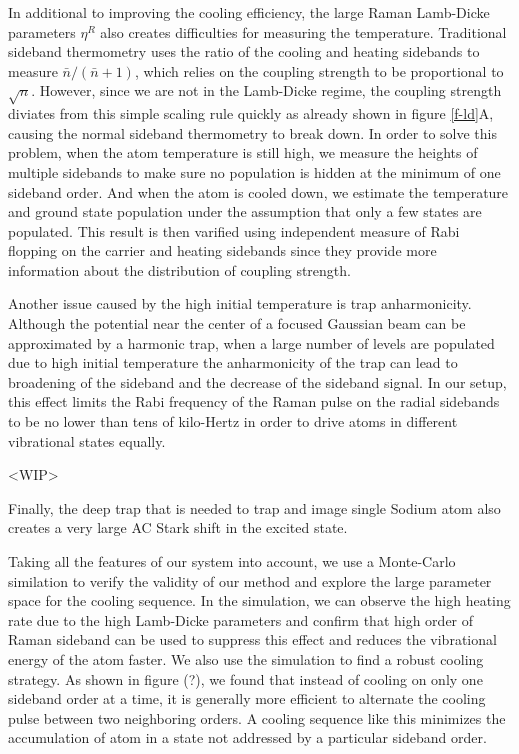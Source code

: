 \documentclass[aps,prl,twocolumn,groupedaddress]{revtex4-1}
\begin{document}
In additional to improving the cooling efficiency, the large Raman Lamb-Dicke parameters $\eta^R$
also creates difficulties for measuring the temperature. Traditional sideband thermometry uses
the ratio of the cooling and heating sidebands to measure $\bar n / (\bar n + 1)$, which relies
on the coupling strength to be proportional to $\sqrt{n}$. However, since we are not in the
Lamb-Dicke regime, the coupling strength diviates from this simple scaling rule quickly as already
shown in figure \ref{f-ld}A, causing the normal sideband thermometry to break down.
In order to solve this problem, when the atom temperature is still high,
we measure the heights of multiple sidebands to make sure no population is hidden at the
minimum of one sideband order. And when the atom is cooled down, we estimate the temperature
and ground state population under the assumption that only a few states are populated.
This result is then varified using independent measure of Rabi flopping on the carrier and heating
sidebands since they provide more information about the distribution of coupling strength.

Another issue caused by the high initial temperature is trap anharmonicity.
Although the potential near the center of a focused Gaussian beam can be approximated
by a harmonic trap, when a large number of levels are populated due to high initial temperature
the anharmonicity of the trap can lead to broadening of the sideband and the decrease of
the sideband signal. In our setup, this effect limits the Rabi frequency of the Raman pulse
on the radial sidebands to be no lower than tens of kilo-Hertz in order to drive atoms in
different vibrational states equally.

<WIP>

Finally, the deep trap that is needed to trap and image single Sodium atom also creates
a very large AC Stark shift in the excited state.


Taking all the features of our system into account, we use a Monte-Carlo similation to verify
the validity of our method and explore the large parameter space for the cooling sequence.
In the simulation, we can observe the high heating rate due to the high Lamb-Dicke parameters
and confirm that high order of Raman sideband can be used to suppress this effect and reduces
the vibrational energy of the atom faster.
We also use the simulation to find a robust cooling strategy. As shown in figure (?),
we found that instead of cooling on only one sideband order at a time, it is generally more
efficient to alternate the cooling pulse between two neighboring orders. A cooling sequence
like this minimizes the accumulation of atom in a state not addressed by a particular sideband order.\\
\end{document}
